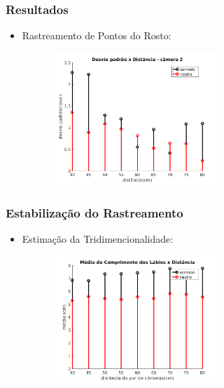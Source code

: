 \documentclass[brazil]{beamer}
\begin{document}
\begin{frame}
\frametitle{Resultados}
  \begin{itemize}
      \item Rastreamento de Pontos do Rosto:
      
       \begin{figure}
        \centering
        \includegraphics[width = 0.6\textwidth, keepaspectratio]{./img/desvio_cameraDireita.jpg}
      \end{figure}
          
  \end{itemize} 
\end{frame}

\begin{frame}
\frametitle{Estabilização do Rastreamento}
  \begin{itemize}
      \item Estimação da Tridimencionalidade:
      \begin{figure}
        \centering
        \includegraphics[width = 0.6\textwidth, keepaspectratio]{./img/media_3d.png}
      \end{figure}
               
  \end{itemize} 
\end{frame}
\end{document}
